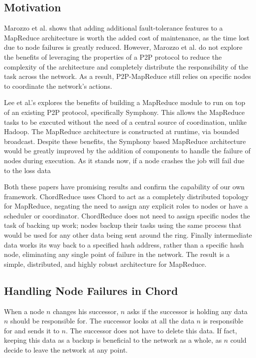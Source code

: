 \documentclass[10pt, conference, compsocconf]{IEEEtran}
\begin{document}
\subsection{Motivation}



Marozzo et al. \cite{marozzo2012p2p} shows that adding additional fault-tolerance features to a MapReduce architecture is worth the added cost of maintenance, as the time lost due to node failures is greatly reduced.  However, Marozzo et al. do not explore the benefits of leveraging the properties of a P2P protocol to reduce the complexity of the architecture and completely distribute the responsibility of the task across the network.  As a result, P2P-MapReduce still relies on specific nodes to coordinate the network's actions.

Lee et al.'s \cite{leemap} explores the benefits of building a MapReduce module to run on top of an existing P2P protocol, specifically Symphony.  This allows the MapReduce tasks to be executed without the need of a central source of coordination, unlike Hadoop.  The MapReduce architecture is constructed at runtime, via bounded broadcast. Despite these benefits, the Symphony based MapReduce architecture would be greatly improved by the addition of components to handle the failure of nodes during execution.  As it stands now, if a node crashes the job will fail due to the loss data

Both these papers have promising results and confirm the capability of our own framework.  ChordReduce uses Chord to act as a completely distributed topology for MapReduce, negating the need to assign any explicit roles to nodes or have a scheduler or coordinator.  ChordReduce does not need to assign specific nodes the task of backing up work; nodes backup their tasks using the same process that would be used for any other data being sent around the ring.  Finally intermediate data works its way back to a specified hash address, rather than a specific hash node, eliminating any single point of failure in the network.  The result is a simple, distributed, and highly robust architecture for MapReduce.


\subsection{Handling Node Failures in Chord}
When a node $n$ changes his successor, $n$ asks if the successor is holding any data $n$ should be responsible for.  The successor looks at all the data $n$ is responsible for and sends it  to $n$.  The successor does not have to delete this data. If fact, keeping this data as a backup is beneficial to the network as a whole, as $n$ could decide to leave the network at any point. 
\end{document}
